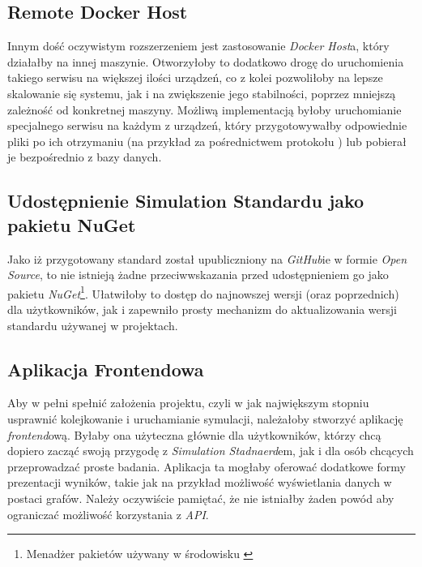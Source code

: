 \subsection{Remote Docker Host}

\par Innym dość oczywistym rozszerzeniem jest zastosowanie \emph{Docker Host}a, który działałby na innej maszynie. Otworzyłoby to dodatkowo drogę do uruchomienia takiego serwisu na większej ilości urządzeń, co z kolei pozwoliłoby na lepsze skalowanie się systemu, jak i na zwiększenie jego stabilności, poprzez mniejszą zależność od konkretnej maszyny. Możliwą implementacją byłoby uruchomianie specjalnego serwisu na każdym z urządzeń, który przygotowywałby odpowiednie pliki po ich otrzymaniu (na przykład za pośrednictwem protokołu \texttt{\https{}}) lub pobierał je bezpośrednio z bazy danych.

\subsection{Udostępnienie Simulation Standardu jako pakietu NuGet}

\par Jako iż przygotowany standard został upubliczniony na \emph{GitHub}ie w formie \emph{Open Source}, to nie istnieją żadne przeciwwskazania przed udostępnieniem go jako pakietu \emph{NuGet}\footnote{Menadżer pakietów używany w środowisku \emph{\dotnet{}}}. Ułatwiłoby to dostęp do najnowszej wersji (oraz poprzednich) dla użytkowników, jak i zapewniło prosty mechanizm do aktualizowania wersji standardu używanej w projektach.

\subsection{Aplikacja Frontendowa}

\par Aby w pełni spełnić założenia projektu, czyli w jak największym stopniu usprawnić kolejkowanie i uruchamianie symulacji, należałoby stworzyć aplikację \emph{frontend}ową. Byłaby ona użyteczna głównie dla użytkowników, którzy chcą dopiero zacząć swoją przygodę z \emph{Simulation Stadnaerd}em, jak i dla osób chcących przeprowadzać proste badania. Aplikacja ta mogłaby oferować dodatkowe formy prezentacji wyników, takie jak na przykład możliwość wyświetlania danych w postaci grafów. Należy oczywiście pamiętać, że nie istniałby żaden powód aby ograniczać możliwość korzystania z \emph{API}.

